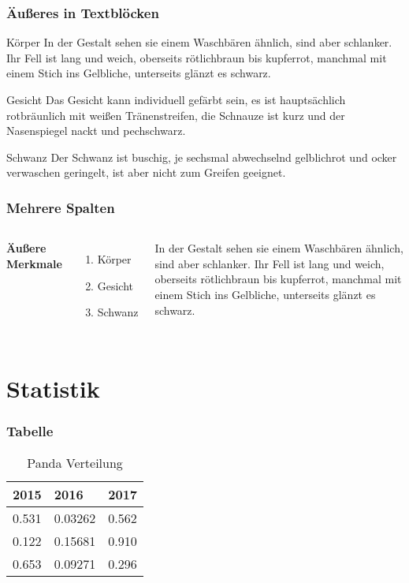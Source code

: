 \documentclass{beamer}
\begin{document}
\begin{frame}
	\frametitle{Äußeres in Textblöcken}
	\begin{block}{Körper}
		In der Gestalt sehen sie einem Waschbären ähnlich, sind aber schlanker. Ihr Fell ist lang und weich, oberseits rötlichbraun bis kupferrot, manchmal mit einem Stich ins Gelbliche, unterseits glänzt es schwarz.
	\end{block}
	\pause
	\begin{block}{Gesicht}
		Das Gesicht kann individuell gefärbt sein, es ist hauptsächlich rotbräunlich mit weißen Tränenstreifen, die Schnauze ist kurz und der Nasenspiegel nackt und pechschwarz. 
	\end{block}
	\pause
	\begin{block}{Schwanz}
		Der Schwanz ist buschig, je sechsmal abwechselnd gelblichrot und ocker verwaschen geringelt, ist aber nicht zum Greifen geeignet.
	\end{block}
\end{frame}

\begin{frame}
	\frametitle{Mehrere Spalten}
	\begin{columns}[c] %
		 
		\textbf{Äußere Merkmale}
		\begin{enumerate}
			\item Körper
			\item Gesicht
			\item Schwanz
		\end{enumerate}
		
		In der Gestalt sehen sie einem Waschbären ähnlich, sind aber schlanker. Ihr Fell ist lang und weich, oberseits rötlichbraun bis kupferrot, manchmal mit einem Stich ins Gelbliche, unterseits glänzt es schwarz.
		 
	\end{columns}
\end{frame}

\section{Statistik}

\begin{frame}
	\frametitle{Tabelle}
	\begin{table}
		\begin{tabular}{l l l}
			\toprule
			\textbf{2015} & \textbf{2016} & \textbf{2017} \\
			\midrule
			0.531         & 0.03262       & 0.562         \\
			0.122         & 0.15681       & 0.910         \\
			0.653         & 0.09271       & 0.296         \\
			\bottomrule
		\end{tabular}
		\caption{Panda Verteilung}
	\end{table}
\end{frame}
\end{document}
